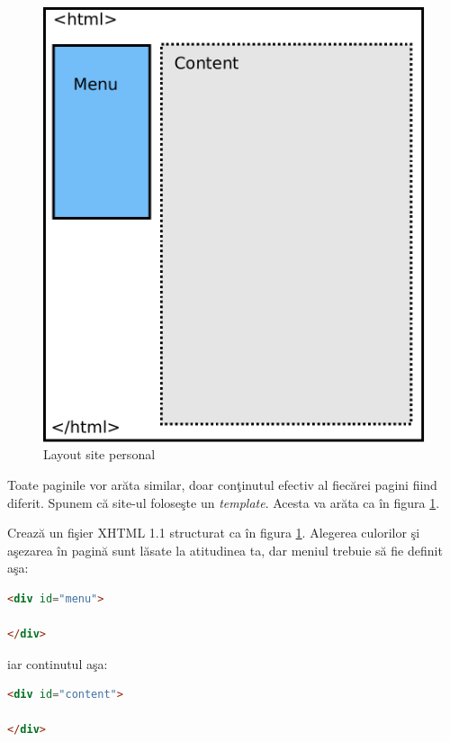 \begin{figure}[H]
  \centering
    \includegraphics[scale=.5]{cap03/homepage-layout-crop.pdf}
  \caption{Layout site personal}
  \label{fig:layout site personal}
\end{figure}

Toate paginile vor
arăta similar, doar conţinutul efectiv al fiecărei pagini fiind diferit. Spunem că site-ul
foloseşte un \textit{template}. Acesta va arăta ca în figura \ref{fig:layout site personal}.


\begin{Exercise}[title={Crează template}]
Crează un fişier XHTML 1.1 structurat ca
în figura \ref{fig:layout site personal}. Alegerea culorilor şi aşezarea
în pagină sunt lăsate la atitudinea ta, dar meniul trebuie să fie
definit aşa:
\begin{lstlisting}[language=html]
<div id="menu">

</div>
\end{lstlisting}
iar continutul aşa:
\begin{lstlisting}[language=html]
<div id="content">

</div>
\end{lstlisting}
\end{Exercise}

